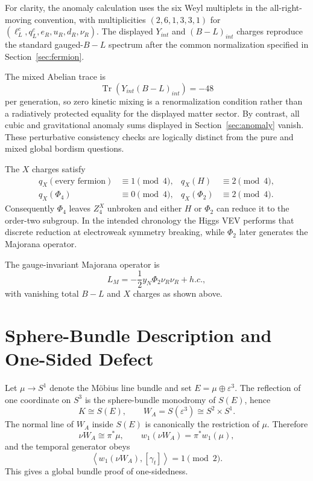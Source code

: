 \documentclass[11pt]{article}
\theoremstyle{canonmath}
\theoremstyle{canonpostulate}
\theoremstyle{canonclaim}
\providecommand{\Klein}{\mathcal{K}}
\providecommand{\Sone}{S^1}
\def\mathrm#1{#1}%
\def\mathbb#1{#1}%
\def\mathcal#1{#1}%
\begin{document}
For clarity, the anomaly calculation uses the six Weyl multiplets in the all-right-moving convention, with multiplicities $(2,6,1,3,3,1)$ for $(\ell_L^c,q_L^c,e_R,u_R,d_R,\nu_R)$. The displayed $Y_{\mathrm{int}}$ and $(B-L)_{\mathrm{int}}$ charges reproduce the standard gauged-$B-L$ spectrum after the common normalization specified in Section~\ref{sec:fermion}.

The mixed Abelian trace is
\begin{equation}
\operatorname{Tr}\!\left(Y_{\mathrm{int}}(B-L)_{\mathrm{int}}\right)=-48
\end{equation}
per generation, so zero kinetic mixing is a renormalization condition rather than a radiatively protected equality for the displayed matter sector. By contrast, all cubic and gravitational anomaly sums displayed in Section~\ref{sec:anomaly} vanish. These perturbative consistency checks are logically distinct from the pure and mixed global bordism questions.

The $X$ charges satisfy
\begin{equation}
\begin{aligned}
q_X(\text{every fermion})&\equiv1\pmod4,
& q_X(H)&\equiv2\pmod4,\\
q_X(\Phi_4)&\equiv0\pmod4,
& q_X(\Phi_2)&\equiv2\pmod4.
\end{aligned}
\end{equation}
Consequently $\Phi_4$ leaves $\mathbb Z_4^X$ unbroken and either $H$ or $\Phi_2$ can reduce it to the order-two subgroup. In the intended chronology the Higgs VEV performs that discrete reduction at electroweak symmetry breaking, while $\Phi_2$ later generates the Majorana operator.

The gauge-invariant Majorana operator is
\begin{equation}
\mathcal L_M=-\frac12y_N\Phi_2\nu_R\nu_R+\mathrm{h.c.},
\end{equation}
with vanishing total $B-L$ and $X$ charges as shown above.

\section{Sphere-Bundle Description and One-Sided Defect}
\label{app:geometry}

Let $\mu\to\Sone$ denote the M\"obius line bundle and set $E=\mu\oplus\varepsilon^3$. The reflection of one coordinate on $S^3$ is the sphere-bundle monodromy of $S(E)$, hence
\begin{equation}
\Klein\cong S(E),
\qquad
W_A=S(\varepsilon^3)\cong S^2\times S^1.
\end{equation}
The normal line of $W_A$ inside $S(E)$ is canonically the restriction of $\mu$. Therefore
\begin{equation}
\nu W_A\cong\pi^*\mu,
\qquad
w_1(\nu W_A)=\pi^*w_1(\mu),
\end{equation}
and the temporal generator obeys
\begin{equation}
\left\langle w_1(\nu W_A),[\gamma_t]\right\rangle=1\pmod2.
\end{equation}
This gives a global bundle proof of one-sidedness.
\end{document}
